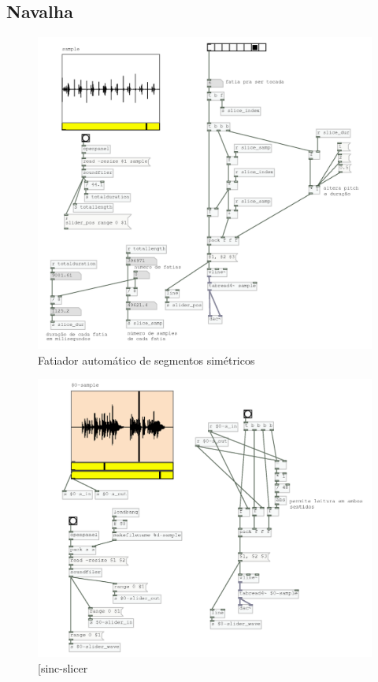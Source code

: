 \documentclass[draft]{ppgmus}
\begin{document}
\subsection {Navalha}

\begin{figure}
\includegraphics[scale=.2]{slicer3}
\caption{Fatiador automático de segmentos simétricos}
\label{slicer3}
\end{figure}

\begin{figure}
\includegraphics[scale=.6]{sinc-slicer}
\caption{[sinc-slicer}
\label{sinc-slicer}
\end{figure}
\end{document}
